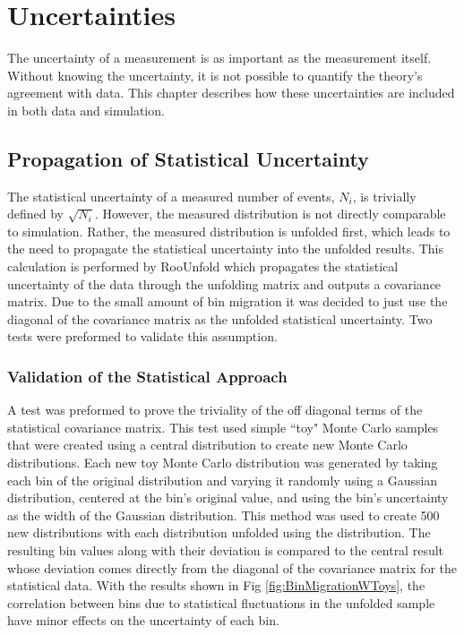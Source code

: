 
\chapter{\texorpdfstring{\phistar}{Phistar} Uncertainties}
\label{Uncertainties_chapter}
The uncertainty of a measurement is as important as the measurement itself. Without knowing the uncertainty, it is not possible to quantify the theory's agreement with data. This chapter describes how these uncertainties are included in both data and simulation.

\section{Propagation of Statistical Uncertainty}
The statistical uncertainty of a measured number of events, $N_{i}$, is trivially defined by $\sqrt{N_{i}}$. However, the measured \phistar distribution is not directly comparable to simulation. Rather, the measured \phistar distribution is unfolded first, which leads to the need to propagate the statistical uncertainty into the unfolded results. This calculation is performed by RooUnfold which propagates the statistical uncertainty of the data through the unfolding matrix and outputs a covariance matrix. Due to the small amount of bin migration it was decided to just use the diagonal of the covariance matrix as the unfolded statistical uncertainty. Two tests were preformed to validate this assumption. 
\subsection{Validation of the Statistical Approach}
A test was  preformed to prove the triviality of the off diagonal terms of the statistical covariance matrix. This test used simple ``toy" Monte Carlo samples that were created using a central \MADGRAPH \phistar distribution to create new Monte Carlo distributions. Each new toy Monte Carlo distribution was generated by taking each bin of the original \MADGRAPH distribution and varying it randomly using a Gaussian distribution, centered at the bin's original value, and using the bin's uncertainty as the width of the Gaussian distribution. This method was used to create 500 new distributions with each distribution unfolded using the \POWHEG distribution. The resulting bin values along with their deviation is compared to the central result whose deviation comes directly from the diagonal of the covariance matrix for the statistical data.  With the results shown in Fig \ref{fig:BinMigrationWToys}, the correlation between bins due to statistical fluctuations in the unfolded sample have minor effects on the uncertainty of each bin. 

